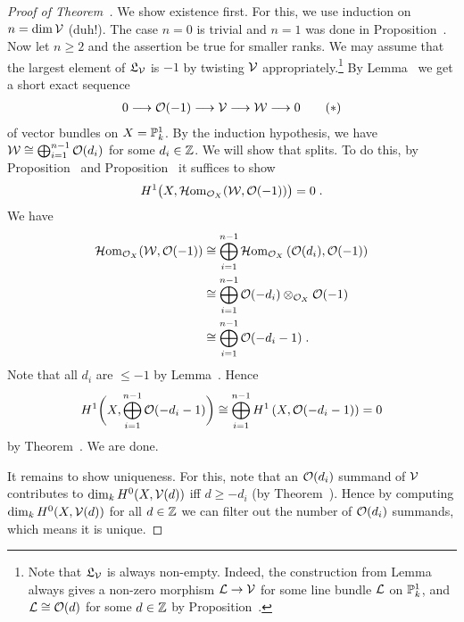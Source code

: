 \documentclass[a4paper,parskip=half,numbers=enddot, DIV=12]{scrreprt}
\renewcommand{\leq}{\leqslant}
\renewcommand{\geq}{\geqslant}
\begin{document}
\begin{proof}[Proof of Theorem~]
	We show existence first. For this, we use induction on $n=\dim\mathcal{V}$ (duh!). The case $n=0$ is trivial and $n=1$ was done in Proposition~. Now let $n\geq 2$ and the assertion be true for smaller ranks. We may assume that the largest element of $\mathfrak{L}_{\mathcal{V}}$ is $-1$ by twisting $\mathcal{V}$ appropriately.\footnote{Note that $\mathfrak{L}_{\mathcal{V}}$ is always non-empty. Indeed, the construction from Lemma~ always gives a non-zero morphism $\Ll\morphism\Vv$ for some line bundle $\mathcal{L}$ on $\mathbb{P}_k^1$, and $\mathcal{L}\cong\mathcal{O}(d)$ for some $d\in\mathbb{Z}$ by Proposition~.} By Lemma~ we get a short exact sequence
	\begin{align}\lbl{eq:ExactSeq}
		0\morphism\Oo(-1)\morphism\Vv\morphism\Ww\morphism 0\tag{$*$}
	\end{align}
	of vector bundles on $X=\mathbb{P}_k^1$. By the induction hypothesis, we have $\mathcal{W}\cong\bigoplus_{i=1}^{n-1}\mathcal{O}(d_i)$ for some $d_i\in\mathbb{Z}$. We will show that  splits. To do this, by Proposition~ and Proposition~ it suffices to show 
	\begin{align*}
		H^1\big(X,\operatorname{\mathcal{H} om}_{\mathcal{O}_X}(\mathcal{W},\mathcal{O}(-1))\big)=0\;. 
	\end{align*}
	We have 
	\begin{align*}
		\operatorname{\mathcal{H} om}_{\mathcal{O}_X}(\mathcal{W},\mathcal{O}(-1))&\cong\bigoplus_{i=1}^{n-1}\operatorname{\mathcal{H} om}_{\mathcal{O}_X}\left(\mathcal{O}(d_i),\mathcal{O}(-1)\right)\\
		&\cong \bigoplus_{i=1}^{n-1}\mathcal{O}(-d_i)\otimes_{\mathcal{O}_X}\mathcal{O}(-1)\\&\cong \bigoplus_{i=1}^{n-1}\mathcal{O}(-d_i-1)\;.
	\end{align*}
	Note that all $d_i$ are $\leq -1$ by Lemma~. Hence
	\begin{align*}
		H^1\bigg(X,\bigoplus_{i=1}^{n-1}\mathcal{O}(-d_i-1)\bigg)\cong \bigoplus_{i=1}^{n-1}H^1\left(X,\mathcal{O}(-d_i-1)\right)=0
	\end{align*}
	by Theorem~. We are done.
	
	It remains to show uniqueness. For this, note that an $\mathcal{O}(d_i)$ summand of $\mathcal{V}$ contributes to $\dim_kH^0(X,\mathcal{V}(d))$ iff $d\geq -d_i$ (by Theorem~). Hence by computing $\dim_kH^0(X,\mathcal{V}(d))$ for all $d\in\mathbb{Z}$ we can filter out the number of $\mathcal{O}(d_i)$ summands, which means it is unique.
\end{proof}
\end{document}
